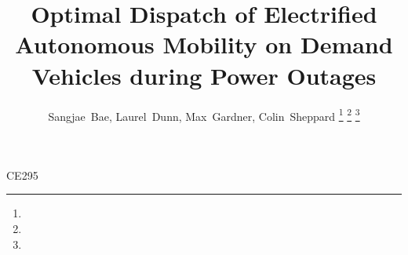 \documentclass[journal]{IEEEtran}
\begin{document}
%
\title{Optimal Dispatch of Electrified Autonomous Mobility on Demand Vehicles during Power Outages}
%
%
%

\author{Sangjae~Bae, Laurel~Dunn, Max~Gardner, Colin~Sheppard%
\thanks{}%
\thanks{}%
\thanks{}}

% 
%



%
{CE295}
% 




\end{document}
